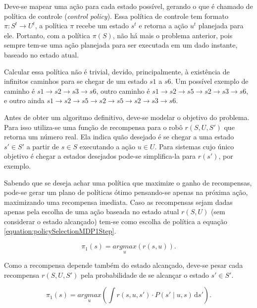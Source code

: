 Deve-se mapear uma ação para cada estado possível, gerando o que é chamado de política de controle (\textit{control policy}). Essa política de controle tem formato $ \pi: S^t \rightarrow U^t $, a política $ \pi $ recebe um estado $ s^t $ e retorna a ação $ u^t $ planejada para ele. Portanto, com a política $ \pi \left( S \right) $, não há mais o problema anterior, pois sempre tem-se uma ação planejada para ser executada em um dado instante, baseado no estado atual.

Calcular essa política não é trivial, devido, principalmente, à existência de infinitos caminhos para se chegar de um estado $ s1 $ a $ s6 $. Um possível exemplo de caminho é $ s1 \rightarrow s2 \rightarrow s3 \rightarrow s6 $, outro caminho é $ s1 \rightarrow s2 \rightarrow s5 \rightarrow s2 \rightarrow s3 \rightarrow s6 $, e outro ainda $ s1 \rightarrow s2 \rightarrow s5 \rightarrow s2 \rightarrow s5 \rightarrow s2 \rightarrow s3 \rightarrow s6 $.

Antes de obter um algoritmo definitivo, deve-se modelar o objetivo do problema. Para isso utiliza-se uma função de recompensa para o robô $ r \left( S, U, S' \right) $ que retorna um número real. Ela indica quão desejado é se chegar a uma estado $ s' \in S' $ a partir de $ s \in S $ executando a ação $ u \in U $. Para sistemas cujo único objetivo é chegar a estados desejados pode-se simplifica-la para $ r \left( s' \right) $, por exemplo.

Sabendo que se deseja achar uma política que maximize o ganho de recompensas, pode-se gerar um plano de políticas ótimo pensando-se apenas na próxima ação, maximizando uma recompensa imediata. Caso as recompensas sejam dadas apenas pela escolha de uma ação baseada no estado atual $ r \left( S, U \right) $ (sem considerar o estado alcançado) tem-se como escolha de política a equação \ref{equation:policySelectionMDP1Step}.

\begin{equation} \label{equation:policySelectionMDP1Step}
    \pi_1 \left( s \right) = \underset{u}{argmax} \left( r \left( s, u \right) \right).
\end{equation}

Como a recompensa depende também do estado alcançado, deve-se pesar cada recompensa $ r \left( S, U, S' \right) $ pela probabilidade de se alcançar o estado $ s' \in S' $.

\begin{equation}
    \pi_1 \left( s \right) = \underset{u}{argmax} \left( \int \! r \left( s, u, s' \right) \cdot P \left( s' \mid u, s \right) \, \mathrm{d}s' \right).
\end{equation}

